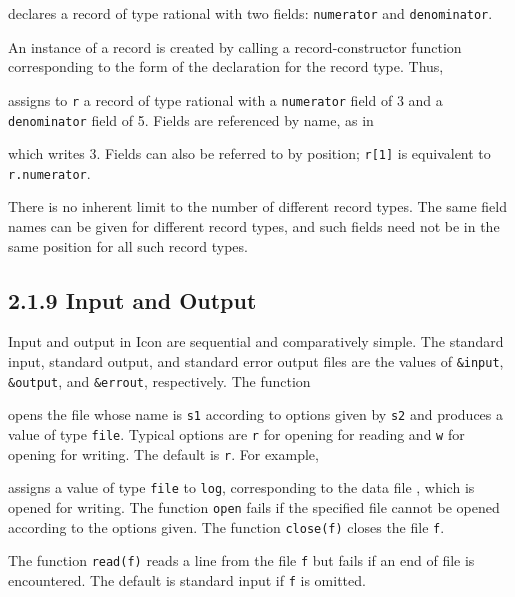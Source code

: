 \noindent
declares a record of type rational with two fields: \texttt{numerator} and
\texttt{denominator}.

An instance of a record is created by calling a record-constructor
function corresponding to the form of the declaration for the record
type. Thus,


\noindent
assigns to \texttt{r} a record of type rational with a \texttt{numerator}
field of 3 and a \texttt{denominator} field of 5. Fields are referenced by
name, as in


\noindent which writes 3. Fields can also be referred to by position;
\texttt{r[1]} is equivalent to \texttt{r.numerator}.

There is no inherent limit to the number of different record
types. The same field names can be given for different record types,
and such fields need not be in the same position for all such record
types.


\subsection[2.1.9 Input and Output]{2.1.9 Input and Output}

Input and output in Icon are sequential and comparatively simple. The
standard input, standard output, and standard error output files are
the values of \texttt{\&input}, \texttt{\&output}, and
\texttt{\&errout}, respectively. The function


\noindent opens the file whose name is \texttt{s1} according to
options given by \texttt{s2} and produces a value of type \texttt{file}.
Typical options are \texttt{{\textquotedbl}r{\textquotedbl}} for
opening for reading and \texttt{{\textquotedbl}w{\textquotedbl}} for
opening for writing. The default is
\texttt{{\textquotedbl}r{\textquotedbl}}. For example,


\noindent assigns a value of type \texttt{file} to \texttt{log},
corresponding to the data file , which is opened for
writing. The function \texttt{open} fails if the specified file cannot be
opened according to the options given. The function \texttt{close(f)}
closes the file \texttt{f}.

The function \texttt{read(f)} reads a line from the file \texttt{f}
but fails if an end of file is encountered. The default is standard
input if \texttt{f} is omitted.

